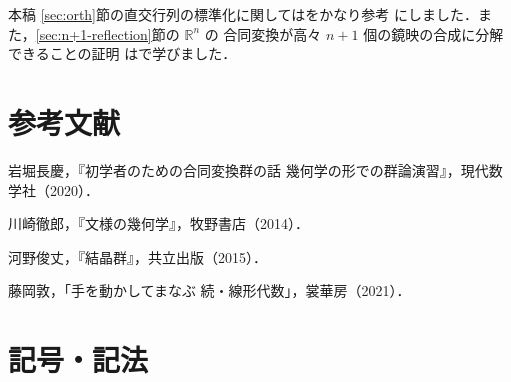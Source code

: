 \documentclass[11pt, uplatex, dvipdfmx, titlepage]{jsarticle}
\theoremstyle{definition}
\begin{document}
本稿 \ref{sec:orth}節の直交行列の標準化に関しては\cite{Fujioka}をかなり参考
にしました．また，\ref{sec:n+1-reflection}節の $\mathbb{R}^n$ の
合同変換が高々 $n+1$ 個の鏡映の合成に分解できることの証明
は\cite{Iwahori}で学びました．



\section*{参考文献}
\begin{enumerate}[{[}1{]}]
 岩堀長慶，『初学者のための合同変換群の話 幾何学の形での群論演習』，現代数学社（2020）．

 川崎徹郎，『文様の幾何学』，牧野書店（2014）．

 河野俊丈，『結晶群』，共立出版（2015）．

 藤岡敦，「手を動かしてまなぶ 続・線形代数」，裳華房（2021）．
\end{enumerate}

 
 \newpage

 \section*{記号・記法}
 
\end{document}
